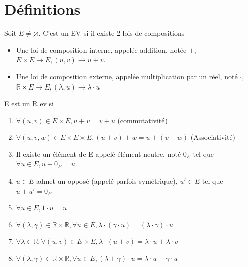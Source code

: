 \documentclass[french]{yLectureNote}
\newcommand{\R}[0]{\mathbb{R}}
\begin{document}
\section{Définitions}
\begin{definition}
Soit \(E \neq \varnothing\). C'est un EV si il existe 2 lois de compositions
\begin{itemize}
 \item Une loi de composition interne, appelée addition, notée \(+\), \(E\times E \to E, (u,v) \to u+v\).
 \item Une loi de composition externe, appelée multiplication par un réel, noté \(\cdot\), \(\R \times E \to E, (\lambda, u)\to \lambda \cdot u\)
\end{itemize}
E est un R ev si
\begin{enumerate}
 \item \(\forall (u,v)\in E\times E, u+v=v+u\) (commutativité)
 \item \(\forall (u,v,w)\in E\times E\times E, (u+v)+w=u+(v+w)\) (Associativité)
 \item Il existe un élément de E appelé élément neutre, noté \(0_E\) tel que \(\forall u\in E,u+0_E = u\).
 \item \(u\in E\) admet un opposé (appelé parfois symétrique), \(u'\in E\) tel que \(u+u' = 0_E\)
\item \(\forall u\in E, 1\cdot u = u\)
\item \(\forall (\lambda,\gamma)\in \R\times\R,\forall u\in E, \lambda\cdot(\gamma\cdot u) = (\lambda\cdot \gamma)\cdot u\)
\item \(\forall \lambda\in \R, \forall (u,v)\in E\times E,\lambda\cdot (u+v) = \lambda\cdot u+\lambda \cdot v\)
\item \(\forall( \lambda, \gamma)\in \R\times \R, \forall u\in E, (\lambda+\gamma)\cdot u = \lambda \cdot u + \gamma \cdot u\)
\end{enumerate}
\end{definition}
\end{document}
